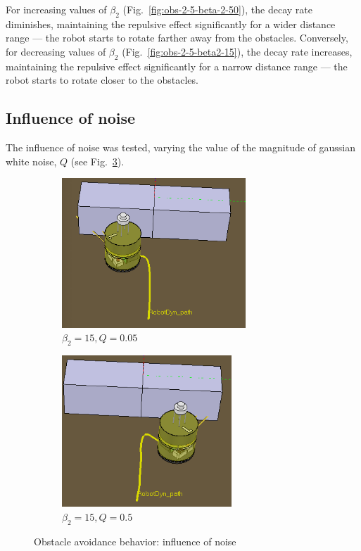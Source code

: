 For increasing values of $\beta_2$ (Fig.~\ref{fig:obs-2-5-beta-2-50}), the decay rate
diminishes, maintaining the repulsive effect significantly for
a wider distance range --- the robot starts to rotate farther away from the obstacles.
Conversely, for decreasing values of $\beta_2$ (Fig.~\ref{fig:obs-2-5-beta2-15}), the decay rate
increases, maintaining the repulsive effect significantly for
a narrow distance range --- the robot starts to rotate closer to the obstacles.

\subsection{Influence of noise}%
\label{sec:influence-noise-obs}
The influence of noise was tested, varying the value of the magnitude of
gaussian white noise, $Q$ (see Fig.~\ref{fig:obs-2-6}).
%
\begin{figure}[!hbt]
\centering
\begin{subfigure}{.5\textwidth}
  \centering
  \includegraphics[width=0.76\textwidth]{./img/obs-2-6-Q-005.png}%
  \caption{$\beta_2 = 15, Q = 0.05$}%
\label{fig:obs-2-6-Q-005}
\end{subfigure}%
\begin{subfigure}{.5\textwidth}
  \centering
  \includegraphics[width=0.7\textwidth]{./img/obs-2-6-Q-05.png}%
  \caption{$\beta_2 = 15, Q = 0.5$}%
\label{fig:obs-2-6-Q-05}
\end{subfigure}
  \caption{Obstacle avoidance behavior: influence of noise}%
\label{fig:obs-2-6}
\end{figure}

